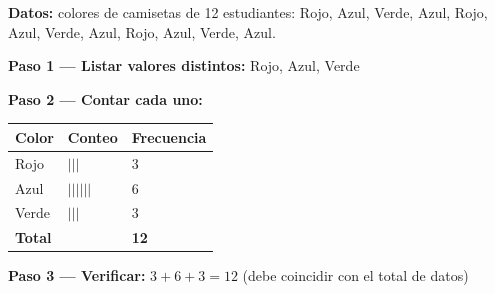 \documentclass[12pt, letterpaper]{article}
\begin{document}
	\begin{ejemplo}
		\textbf{Datos:} colores de camisetas de 12 estudiantes:
		Rojo, Azul, Verde, Azul, Rojo, Azul, Verde, Azul, Rojo, Azul, Verde, Azul.
		
		\vspace{0.3cm}
		\textbf{Paso 1 — Listar valores distintos:}\quad
		Rojo, Azul, Verde
		
		\textbf{Paso 2 — Contar cada uno:}
		\begin{center}
			\renewcommand{\arraystretch}{1.5}
			\begin{tabular}{|m{3cm}|m{3.5cm}|m{2.5cm}|}
				\hline
				\rowcolor{valblue!20}\textbf{Color} &
				\textbf{Conteo} & \textbf{Frecuencia} \\
				\hline
				Rojo  & $|||$ & 3 \\
				\hline
				Azul  & $||||||$ & 6 \\
				\hline
				Verde & $|||$ & 3 \\
				\hline
				\rowcolor{valblue!10}\textbf{Total} & & \textbf{12} \\
				\hline
			\end{tabular}
		\end{center}
		
		\textbf{Paso 3 — Verificar:}\; $3+6+3 = 12$ \;\checkmark\;
		(debe coincidir con el total de datos)
	\end{ejemplo}
	
\end{document}
